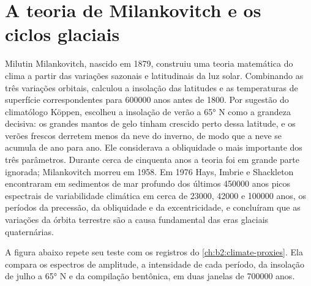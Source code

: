 \section{A teoria de Milankovitch e os ciclos glaciais}\label{sec:b2:orbital-forcing:theory}

\begin{history}
Milutin Milankovitch, nascido em 1879, construiu uma teoria matemática do clima a partir das variações sazonais e latitudinais da luz solar. Combinando as três variações orbitais,
calculou a insolação das latitudes e as temperaturas de superfície correspondentes para
\num{600000} anos antes de 1800. Por sugestão do climatólogo Köppen, escolheu a insolação de verão
a \ang{65} N como a grandeza decisiva: os grandes mantos de gelo tinham crescido perto dessa
latitude, e os verões frescos derretem menos da neve do inverno, de modo que a neve se acumula de ano para
ano. Ele considerava a obliquidade o mais importante dos três parâmetros. Durante cerca de cinquenta anos
a teoria foi em grande parte ignorada; Milankovitch morreu em 1958. Em 1976 Hays, Imbrie e Shackleton
encontraram em sedimentos de mar profundo dos últimos \num{450000} anos picos espectrais de variabilidade climática
em cerca de \num{23000}, \num{42000} e \num{100000} anos, os períodos da precessão, da obliquidade e da
excentricidade, e concluíram que as variações da órbita terrestre são a causa fundamental das
eras glaciais quaternárias.
\end{history}

A figura abaixo repete seu teste com os registros do \cref{ch:b2:climate-proxies}. Ela compara os
espectros de amplitude, a intensidade de cada período, da insolação de julho a \ang{65} N e da
compilação bentônica, em duas janelas de \num{700000} anos.

